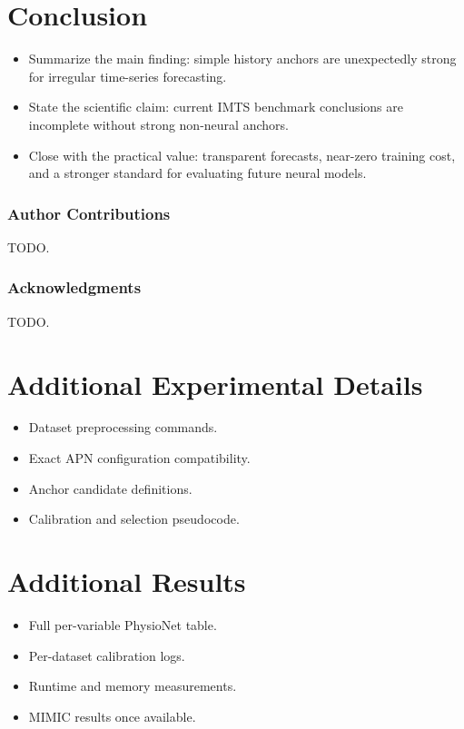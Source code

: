 \documentclass{article}
\begin{document}
\section{Conclusion}

\begin{itemize}
    \item Summarize the main finding: simple history anchors are unexpectedly
    strong for irregular time-series forecasting.
    \item State the scientific claim: current IMTS benchmark conclusions are
    incomplete without strong non-neural anchors.
    \item Close with the practical value: transparent forecasts, near-zero
    training cost, and a stronger standard for evaluating future neural models.
\end{itemize}

\subsubsection*{Author Contributions}
TODO.

\subsubsection*{Acknowledgments}
TODO.




\appendix

\section{Additional Experimental Details}

\begin{itemize}
    \item Dataset preprocessing commands.
    \item Exact APN configuration compatibility.
    \item Anchor candidate definitions.
    \item Calibration and selection pseudocode.
\end{itemize}

\section{Additional Results}

\begin{itemize}
    \item Full per-variable PhysioNet table.
    \item Per-dataset calibration logs.
    \item Runtime and memory measurements.
    \item MIMIC results once available.
\end{itemize}
\end{document}
